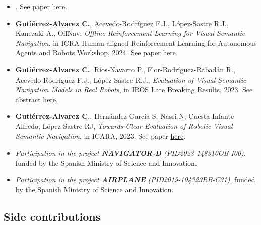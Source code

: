 \begin{itemize}
    \item {}.
    See paper \href{https://link.springer.com/article/10.1007/s10489-024-06115-4}{here}.
    \item \textbf{Gutiérrez-Alvarez C.}, Acevedo-Rodríguez F.J., López-Sastre R.J., Kanezaki A., OffNav: \textit{Offline Reinforcement Learning for Visual Semantic Navigation}, in ICRA Human-aligned Reinforcement Learning for Autonomous Agents and Robots Workshop, 2024.
    See paper \href{https://harlworkshop.github.io/2024/submission_10.pdf}{here}.
    \item \textbf{Gutiérrez-Alvarez C.}, Ríos-Navarro P., Flor-Rodríguez-Rabadán R., Acevedo-Rodríguez F.J., López-Sastre R.J., \textit{Evaluation of Visual Semantic Navigation Models in Real Robots}, in IROS Late Breaking Results, 2023.
    See abstract \href{http://monke.es/media/gutierrez-alvarez-evaluation-of-vsn-models.pdf}{here}.
    \item \textbf{Gutiérrez-Alvarez C.}, Hernández García S, Nasri N, Cuesta-Infante Alfredo, López-Sastre RJ, \textit{Towards Clear Evaluation of Robotic Visual Semantic Navigation}, in ICARA, 2023.
    See paper \href{https://ieeexplore.ieee.org/abstract/document/10125866/}{here}.
    \item \textit{Participation in the project \textbf{NAVIGATOR-D} (PID2023-148310OB-I00)}, funded by the Spanish Ministry of Science and Innovation.
    \item \textit{Participation in the project \textbf{AIRPLANE} (PID2019-104323RB-C31)}, funded by the Spanish Ministry of Science and Innovation.
\end{itemize}

\subsection{Side contributions}\label{subsec:side-contributions}

